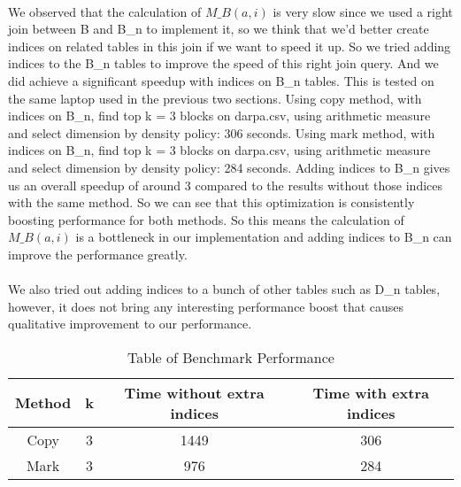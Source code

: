 \paragraph{} We observed that the calculation of $M{\_}B(a,i)$ is very slow since we used a right join between B and B{\_}n to implement it, so we think that we’d better create indices on related tables in this join if we want to speed it up.
So we tried adding indices to the B{\_}n tables to improve the speed of this right join query. And we did achieve a significant speedup with indices on B{\_}n tables. This is tested on the same laptop used in the previous two sections.
Using copy method, with indices on B{\_}n, find top k = 3 blocks on darpa.csv, using arithmetic measure and select dimension by density policy: 306 seconds.
Using mark method, with indices on B{\_}n, find top k = 3 blocks on darpa.csv, using arithmetic measure and select dimension by density policy: 284 seconds.
Adding indices to B{\_}n gives us an overall speedup of around 3 compared to the results without those indices with the same method. So we can see that this optimization
is consistently boosting performance for both methods. So this means the calculation of $M{\_}B(a,i)$ is a bottleneck in our implementation and adding
indices to B{\_}n can improve the performance greatly.
\paragraph{} We also tried out adding indices to a bunch of other tables such as D{\_}n tables, however, it does not bring any
interesting performance boost that causes qualitative improvement to our performance.
\begin{table} [!ht]
\centering
\begin{tabular}{|c|c|c|c|}
    \hline
        Method & k & Time without extra indices & Time with extra indices \\
    \hline
        Copy & 3 & 1449 & 306\\
    \hline
        Mark & 3 & 976 & 284 \\
    \hline
\end{tabular}
\caption{Table of Benchmark Performance}

\end{table}
